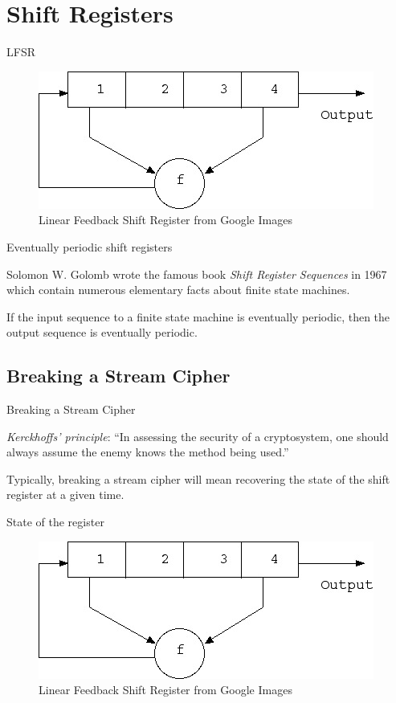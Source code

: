 \documentclass{beamer}
\begin{document}
\section{Shift Registers}
\begin{frame}{LFSR}
  \begin{figure}[h!]
    \centering
    \includegraphics[totalheight=0.5\textheight]{lfsr.jpg}
    \caption{Linear Feedback Shift Register from Google Images}
  \end{figure}
\end{frame}

\begin{frame}{Eventually periodic shift registers}
  \par Solomon W. Golomb wrote the famous book \textit{Shift Register
  Sequences} in 1967 which contain numerous elementary facts about finite
  state machines.
  \begin{theorem}\label{thm:golomb-2}
    If the input sequence to a finite state machine is eventually periodic, then
    the output sequence is eventually periodic.
  \end{theorem}
\end{frame}

\subsection{Breaking a Stream Cipher}
\begin{frame}{Breaking a Stream Cipher}
  \par \textit{Kerckhoffs' principle}: ``In assessing the security of a
  cryptosystem, one should always assume the enemy knows the method being
  used.''
  \par Typically, breaking a stream cipher will mean recovering the state of
  the shift register at a given time.
\end{frame}

\begin{frame}{State of the register}
  \begin{figure}[h!]
    \centering
    \includegraphics[totalheight=0.5\textheight]{lfsr.jpg}
    \caption{Linear Feedback Shift Register from Google Images}
  \end{figure}
\end{frame}
\end{document}
